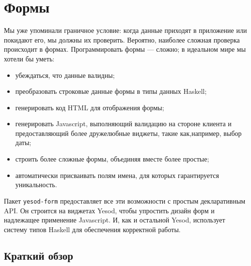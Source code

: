 \chapter{Формы}

Мы уже упоминали граничное условие: когда данные приходят в приложение или покидают его,
мы должны их проверить. Вероятно, наиболее сложная проверка происходит в формах.
Программировать формы --- сложно; в идеальном мире мы хотели бы уметь:

\begin{itemize}
\item убеждаться, что данные валидны; %
\item преобразовать строковые данные формы в типы данных Haskell; %
\item генерировать код HTML для отображения формы;
\item генерировать Javascript, выполняющий валидацию на стороне клиента и предоставляющий
более дружелюбные виджеты, такие как,например, выбор даты;
\item строить более сложные формы, объединяя вместе более простые;
\item автоматически присваивать полям имена, для которых гарантируется уникальность.
\end{itemize}

Пакет \lstinline'yesod-form' предоставляет все эти возможности с простым декларативным
API. Он строится на виджетах Yesod, чтобы упростить дизайн форм и надлежащее применение
Javascript. И, как и остальной Yesod, использует систему типов Haskell для обеспечения
корректной работы.

\section{Краткий обзор}

